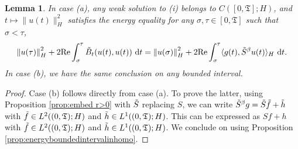\documentclass[11pt, letterpaper]{amsart}
\newtheorem{lem}[thm]{Lemma}
\theoremstyle{definition}
\theoremstyle{remark}
\numberwithin{equation}{section}
\begin{document}
\begin{lem}\label{lem:weaksolCPlocal} In case (a), any weak solution to (i) belongs to $C([0,\mathfrak{T}]; H)$, and $t\mapsto\|u(t)\|_H^2$ satisfies the energy equality
for any  $ \sigma, \tau \in [0,\mathfrak{T}]$ such that $  \sigma < \tau$, 
    \begin{align*}
         \left \| u(\tau) \right \|^2_H + 2\mathrm{Re}\int_{\sigma}^{\tau} \Tilde{B}_t(u(t),u(t))\  \mathrm d t
        = \left \| u(\sigma) \right \|^2_H +  2\mathrm{Re}\int_{\sigma}^{\tau}
        \langle {g}(t), \Tilde{S}^\beta u(t)\rangle_{H}\ \mathrm d t.
    \end{align*}
In case (b), we have the same conclusion on any bounded interval.
\end{lem}
\begin{proof} 
Case (b) follows directly from case (a). To prove the latter, using Proposition \ref{prop:embed r>0} with $\Tilde{S}$ replacing $S$, we can  write  $\Tilde{S}^\beta {g}=\Tilde{S}\Tilde{f}+\Tilde{h}$ with $\Tilde{f} \in L^2((0, \mathfrak{T}); H)$ and $\Tilde{h} \in L^1((0, \mathfrak{T}); H)$. This can be expressed as ${S}{f}+{h}$ with $\Tilde{f} \in L^2((0, \mathfrak{T}); H)$ and $\Tilde{h} \in L^1((0, \mathfrak{T}); H)$. We conclude on using Proposition \ref{prop:energyboundedintervalinhomo}.
\end{proof}
\end{document}
